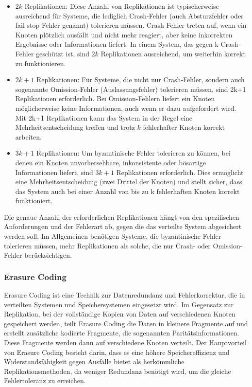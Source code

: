 \begin{itemize}
\item $2k$ Replikationen: Diese Anzahl von Replikationen ist typischerweise ausreichend für Systeme, die lediglich Crash-Fehler (auch Absturzfehler oder fail-stop-Fehler genannt) tolerieren müssen. Crash-Fehler treten auf, wenn ein Knoten plötzlich ausfällt und nicht mehr reagiert, aber keine inkorrekten Ergebnisse oder Informationen liefert. In einem System, das gegen k Crash-Fehler geschützt ist, sind $2k$ Replikationen ausreichend, um weiterhin korrekt zu funktionieren.
\item $2k+1$ Replikationen: Für Systeme, die nicht nur Crash-Fehler, sondern auch sogenannte Omission-Fehler (Auslassungsfehler) tolerieren müssen, sind 2k+1 Replikationen erforderlich. Bei Omission-Fehlern liefert ein Knoten möglicherweise keine Informationen, auch wenn er dazu aufgefordert wird. Mit 2k+1 Replikationen kann das System in der Regel eine Mehrheitsentscheidung treffen und trotz $k$ fehlerhafter Knoten korrekt arbeiten.
\item $3k+1$ Replikationen: Um byzantinische Fehler tolerieren zu können, bei denen ein Knoten unvorhersehbare, inkonsistente oder bösartige Informationen liefert, sind $3k+1$ Replikationen erforderlich. Dies ermöglicht eine Mehrheitsentscheidung (zwei Drittel der Knoten) und stellt sicher, dass das System auch bei einer Anzahl von bis zu k fehlerhaften Knoten korrekt funktioniert.
\end{itemize}
Die genaue Anzahl der erforderlichen Replikationen hängt von den spezifischen Anforderungen und der Fehlerart ab, gegen die das verteilte System abgesichert werden soll. Im Allgemeinen benötigen Systeme, die byzantinische Fehler tolerieren müssen, mehr Replikationen als solche, die nur Crash- oder Omission-Fehler berücksichtigen.

\subsubsection{Erasure Coding}
Erasure Coding ist eine Technik zur Datenredundanz und Fehlerkorrektur, die in verteilten Systemen und Speichersystemen eingesetzt wird. Im Gegensatz zur Replikation, bei der vollständige Kopien von Daten auf verschiedenen Knoten gespeichert werden, teilt Erasure Coding die Daten in kleinere Fragmente auf und erstellt zusätzliche kodierte Fragmente, die sogenannten Paritätsinformationen. Diese Fragmente werden dann auf verschiedene Knoten verteilt. Der Hauptvorteil von Erasure Coding besteht darin, dass es eine höhere Speichereffizienz und Widerstandsfähigkeit gegen Ausfälle bietet als herkömmliche Replikationsmethoden, da weniger Redundanz benötigt wird, um die gleiche Fehlertoleranz zu erreichen.

